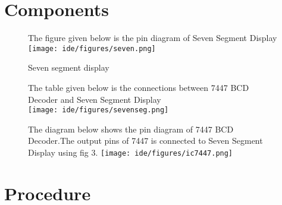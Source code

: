 \documentclass[journal,12pt,twocolumn]{IEEEtran}
\begin{document}
\section{\textbf{Components}}

\begin{table}[!h]
\centering
\caption{}
\label{table:7447_disp}
\end{table}
\begin{figure}
The figure given below is the pin diagram of Seven Segment Display\\
    \centering
    \texttt{[image: ide/figures/seven.png]}
    \caption{Seven segment display}
    \label{fig:my_label}
\end{figure}
\begin{figure}
The table given below is the connections between 7447 BCD Decoder and Seven Segment Display\\
    \centering
    \texttt{[image: ide/figures/sevenseg.png]}
    \caption{}
    \label{fig:my_label}
\end{figure}
\begin{figure}
The diagram below shows the pin diagram of 7447 BCD Decoder.The output pins of 7447 is connected to Seven Segment Display using fig 3.
    \centering
    \texttt{[image: ide/figures/ic7447.png]}
    \caption{}
    \label{fig:my_label}
\end{figure}

\section{Procedure}
\end{document}
